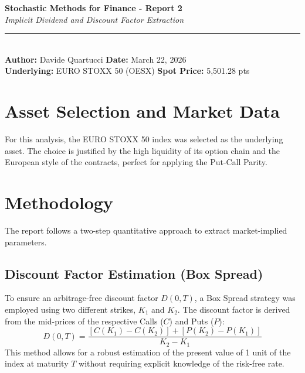 \documentclass{report}
\begin{document}
\pagestyle{fancy}
\fancyhf{}
\renewcommand{\headrulewidth}{0.4pt}
\setlength{\headheight}{14pt}
\thispagestyle{plain} %
\begin{flushleft}
    {\large \textbf{Stochastic Methods for Finance - Report 2}} \\
    \textit{Implicit Dividend and Discount Factor Extraction} \\
    \rule{\textwidth}{0.4pt} \\ %
    \textbf{Author:} Davide Quartucci \hfill \textbf{Date:} March 22, 2026 \\
    \textbf{Underlying:} EURO STOXX 50 (OESX) \hfill \textbf{Spot Price:} 5,501.28 pts \\
\end{flushleft}

\begin{center}
\end{center}

\section{Asset Selection and Market Data}
For this analysis, the EURO STOXX 50 index was selected as the underlying asset. The choice is justified by the high liquidity of its option chain and the European style of the contracts, perfect for applying the Put-Call Parity.

\section{Methodology}
The report follows a two-step quantitative approach to extract market-implied parameters.

\subsection{Discount Factor Estimation (Box Spread)}
To ensure an arbitrage-free discount factor $D(0,T)$, a Box Spread strategy was employed using two different strikes, $K_1$ and $K_2$. The discount factor is derived from the mid-prices of the respective Calls ($C$) and Puts ($P$):
\begin{equation}
D(0,T) = \frac{[C(K_1) - C(K_2)] + [P(K_2) - P(K_1)]}{K_2 - K_1}
\end{equation}
This method allows for a robust estimation of the present value of 1 unit of the index at maturity $T$ without requiring explicit knowledge of the risk-free rate.
\end{document}
